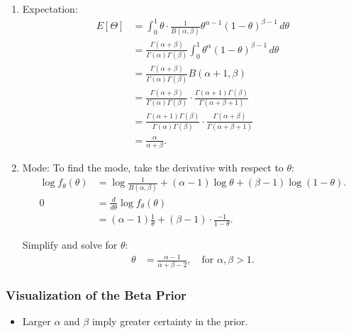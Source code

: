 \begin{derivation}
    \begin{enumerate}
        \item Expectation:
        \begin{align*}
            E[\Theta] &= \int_0^1 \theta \cdot \frac{1}{B(\alpha, \beta)} \theta^{\alpha-1} (1-\theta)^{\beta-1} \, d\theta \\
            &= \frac{\Gamma(\alpha + \beta)}{\Gamma(\alpha) \Gamma(\beta)} \int_0^1 \theta^{\alpha} (1-\theta)^{\beta-1} \, d\theta \\
            &= \frac{\Gamma(\alpha + \beta)}{\Gamma(\alpha) \Gamma(\beta)} B(\alpha + 1, \beta) \\
            &= \frac{\Gamma(\alpha + \beta)}{\Gamma(\alpha) \Gamma(\beta)} \cdot \frac{\Gamma(\alpha + 1) \Gamma(\beta)}{\Gamma(\alpha + \beta + 1)} \\
            &= \frac{\Gamma(\alpha + 1) \Gamma(\beta)}{\Gamma(\alpha) \Gamma(\beta)} \cdot \frac{\Gamma(\alpha + \beta)}{\Gamma(\alpha + \beta + 1)} \\
            &= \frac{\alpha}{\alpha + \beta}.
        \end{align*}
        \item Mode: 
        To find the mode, take the derivative with respect to $\theta$:
        \begin{align*}
        \log f_\theta(\theta) &= \log \frac{1}{B(\alpha, \beta)} + (\alpha - 1) \log \theta + (\beta - 1) \log (1 - \theta). \\
        0 &= \frac{d}{d\theta} \log f_\theta(\theta) \\
        &= (\alpha - 1) \frac{1}{\theta} + (\beta - 1) \cdot \frac{-1}{1 - \theta}.
        \end{align*}
        
        Simplify and solve for $\theta$:
        \begin{align*}
        \theta &= \frac{\alpha - 1}{\alpha + \beta - 2}, \quad \text{for } \alpha, \beta > 1.
            \end{align*}
    \end{enumerate}
\end{derivation}

\subsubsection{Visualization of the Beta Prior}
\begin{notes}
    \begin{itemize}
        \item Larger $\alpha$ and $\beta$ imply greater certainty in the prior.
    \end{itemize}
\end{notes}

